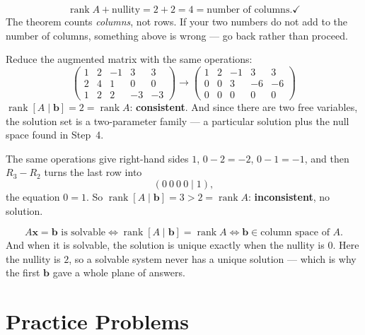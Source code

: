\begin{worked}
\[
  \operatorname{rank}A+\text{nullity}=2+2=4=\text{number of columns.} \checkmark
\]
The theorem counts \emph{columns}, not rows. If your two numbers do not add
to the number of columns, something above is wrong --- go back rather than
proceed.

Reduce the augmented matrix with the same operations:
\[
  \left(\begin{array}{cccc|c}
    1&2&-1&3&3\\ 2&4&1&0&0\\ 1&2&2&-3&-3
  \end{array}\right)
  \longrightarrow
  \left(\begin{array}{cccc|c}
    1&2&-1&3&3\\ 0&0&3&-6&-6\\ 0&0&0&0&0
  \end{array}\right)
\]
$\operatorname{rank}[A\mid\mathbf b]=2=\operatorname{rank}A$:
\textbf{consistent}. And since there are two free variables, the solution
set is a two-parameter family --- a particular solution plus the null space
found in Step~4.

The same operations give right-hand sides $1$, $0-2=-2$, $0-1=-1$, and then
$R_{3}-R_{2}$ turns the last row into
\[
  (0\ 0\ 0\ 0\mid 1) ,
\]
the equation $0=1$. So $\operatorname{rank}[A\mid\mathbf b]=3>2
=\operatorname{rank}A$: \textbf{inconsistent}, no solution.

\[
  A\mathbf x=\mathbf b \text{ is solvable}
  \iff \operatorname{rank}[A\mid\mathbf b]=\operatorname{rank}A
  \iff \mathbf b\in\text{column space of }A .
\]
And when it is solvable, the solution is unique exactly when the nullity is
$0$. Here the nullity is $2$, so a solvable system never has a unique
solution --- which is why the first $\mathbf b$ gave a whole plane of
answers.
\end{worked}

\section{Practice Problems}


